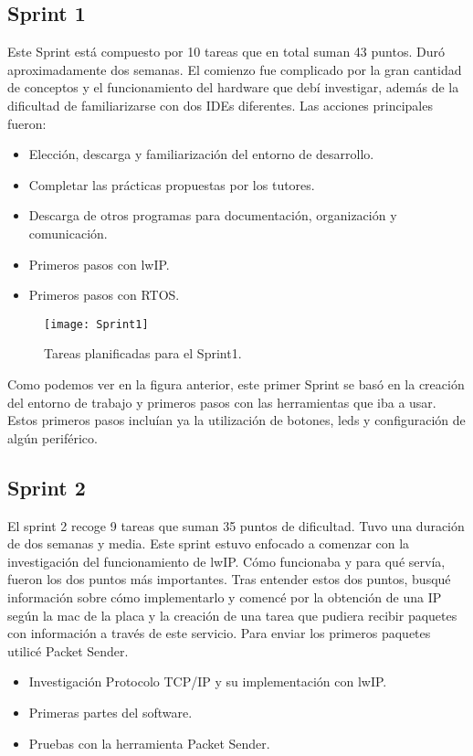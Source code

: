 \subsection{Sprint 1}
Este Sprint está compuesto por 10 tareas que en total suman 43 puntos. Duró aproximadamente dos semanas. El comienzo fue complicado por la gran cantidad de conceptos y el funcionamiento del hardware que debí investigar, además de la dificultad de familiarizarse con dos IDEs diferentes. Las acciones principales fueron:
\begin{itemize}
\item Elección, descarga y familiarización del entorno de desarrollo.
\item Completar las prácticas propuestas por los tutores.
\item Descarga de otros programas para documentación, organización y comunicación.
\item Primeros pasos con lwIP.
\item Primeros pasos con RTOS.
\end{itemize}

\begin{figure}[!h]
	\centering
	\texttt{[image: Sprint1]}
	\caption{Tareas planificadas para el Sprint1.}\label{sp1}
\end{figure}

Como podemos ver en la figura anterior, este primer Sprint se basó en la creación del entorno de trabajo y primeros pasos con las herramientas que iba a usar. Estos primeros pasos incluían ya la utilización de botones, leds y configuración de algún periférico.

\subsection{Sprint 2}
El sprint 2 recoge 9 tareas que suman 35 puntos de dificultad. Tuvo una duración de dos semanas y media. Este sprint estuvo enfocado a comenzar con la investigación del funcionamiento de lwIP. Cómo funcionaba y para qué servía, fueron los dos puntos más importantes. Tras entender estos dos puntos, busqué información sobre cómo implementarlo y comencé por la obtención de una IP según la mac de la placa y la creación de una tarea que pudiera recibir paquetes con información a través de este servicio. Para enviar los primeros paquetes utilicé Packet Sender.
\begin{itemize}
\item Investigación Protocolo TCP/IP y su implementación con lwIP.
\item Primeras partes del software.
\item Pruebas con la herramienta Packet Sender.
\end{itemize}

